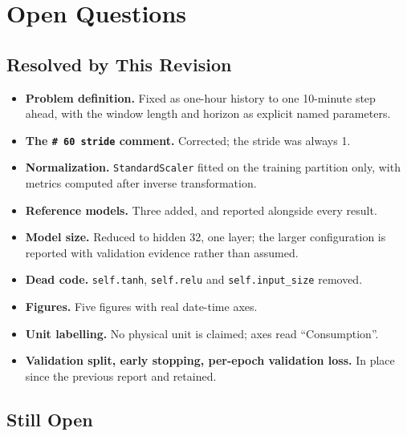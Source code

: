 \documentclass[11pt,a4paper]{article}
\begin{document}
\section{Open Questions}

\subsection{Resolved by This Revision}

\begin{itemize}
  \item \textbf{Problem definition.} Fixed as one-hour history to one 10-minute step ahead, with
        the window length and horizon as explicit named parameters.
  \item \textbf{The \texttt{\# 60 stride} comment.} Corrected; the stride was always 1.
  \item \textbf{Normalization.} \texttt{StandardScaler} fitted on the training partition only,
        with metrics computed after inverse transformation.
  \item \textbf{Reference models.} Three added, and reported alongside every result.
  \item \textbf{Model size.} Reduced to hidden 32, one layer; the larger configuration is reported
        with validation evidence rather than assumed.
  \item \textbf{Dead code.} \texttt{self.tanh}, \texttt{self.relu} and \texttt{self.input\_size}
        removed.
  \item \textbf{Figures.} Five figures with real date-time axes.
  \item \textbf{Unit labelling.} No physical unit is claimed; axes read ``Consumption''.
  \item \textbf{Validation split, early stopping, per-epoch validation loss.} In place since the
        previous report and retained.
\end{itemize}

\subsection{Still Open}
\end{document}
